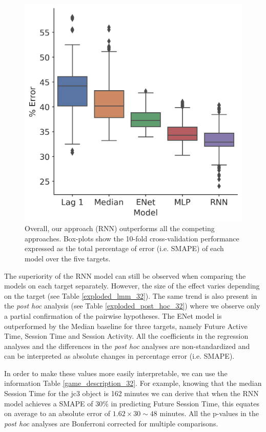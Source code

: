 \begin{figure}[h]
\centering
\includegraphics[width=.5\columnwidth]{images/chapter_3/performance_collapsed_32.png}
\caption[\textbf{Aggregated comparison of model performance}]{ Overall, our approach (RNN) outperforms all the competing approaches. Box-plots show the 10-fold cross-validation performance expressed as the total percentage of error (i.e. SMAPE) of each model over the five targets.}
\label{model_comp_coll_32} 
\end{figure}





The superiority of the RNN model can still be observed when comparing the models on each target separately. However, the size of the effect varies depending on the target (see Table \ref{exploded_lmm_32}). The same trend is also present in the \textit{post hoc} analysis (see Table \ref{exploded_post_hoc_32}) where we observe only a partial confirmation of the pairwise hypotheses. The ENet model is outperformed by the Median baseline for three targets, namely Future Active Time, Session Time and Session Activity. All the coefficients in the regression analyses and the differences in the \textit{post hoc} analyses are non-standardized and can be interpreted as absolute changes in percentage error (i.e. SMAPE). 

In order to make these values more easily interpretable, we can use the information Table \ref{game_description_32}. For example, knowing that the median Session Time for the jc3 object is 162 minutes we can derive that when the RNN model achieves a SMAPE of 30\% in predicting Future Session Time, this equates on average to an absolute error of $1.62 \times 30 \sim 48$ minutes. All the p-values in the \textit{post hoc} analyses are Bonferroni corrected for multiple comparisons. 

